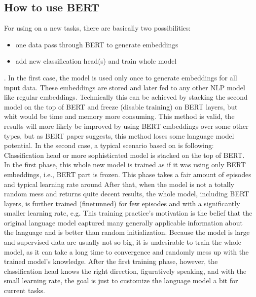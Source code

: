  \subsection{How to use BERT}
 \label{sub:howto}
 For using on a new tasks, there are basically two possibilities:
 \begin{itemize}
 \item one data pass through BERT to generate embeddings
 \item add new classification head(s) and train whole model
 \end{itemize}.
 In the first case, the model is used only once to generate embeddings for all input data. These embeddings are stored and later fed to any other NLP model like regular embeddings. Technically this can be achieved by stacking the second model on the top of BERT and freeze (disable training) on BERT layers, but whit would be time and memory more consuming. This method is valid, the results will more likely be improved by using BERT embeddings over some other types, but as BERT paper suggests, this method loses some language model potential. %
 In the second case, a typical scenario based on  
 is following:
 Classification head or more sophisticated model is stacked on the top of BERT. In the first phase, this whole new model is trained as if it was using only BERT embeddings, i.e., BERT part is frozen. This phase takes a fair amount of episodes %
 and typical learning rate around %
 After that, when the model is not a totally random mess and returns quite decent results, the whole model, including BERT layers, is further trained (finetunned) for few episodes and with a significantly smaller learning rate, e.g. %
 This training practice's motivation is the belief that the original language model captured many generally applicable information about the language and is better than random initialization. Because the model is large and supervised data are usually not so big, it is undesirable to train the whole model, as it can take a long time to convergence and randomly mess up with the trained model's knowledge. After the first training phase, however, the classification head knows the right direction, figuratively speaking, and with the small learning rate, the goal is just to customize the language model a bit for current tasks. %

